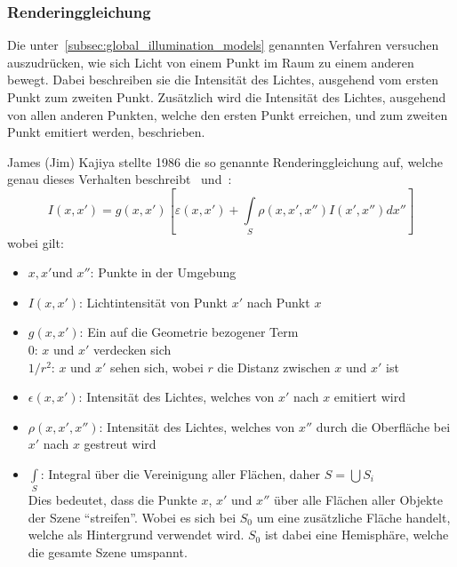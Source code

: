 \subsubsection{Renderinggleichung}
\label{ssubsec:rendering_equation}

Die unter~\ref{subsec:global_illumination_models} genannten Verfahren versuchen
auszudrücken, wie sich Licht von einem Punkt im Raum zu einem anderen bewegt.
Dabei beschreiben sie die Intensität des Lichtes, ausgehend vom ersten Punkt
zum zweiten Punkt. Zusätzlich wird die Intensität des Lichtes, ausgehend von
allen anderen Punkten, welche den ersten Punkt erreichen, und zum zweiten Punkt
emitiert werden, beschrieben.


James (Jim) Kajiya stellte 1986 die so genannte Renderinggleichung auf, welche
genau dieses Verhalten beschreibt~\cite{kajiya_rendering_1986}
und~\cite{foley_computer_1996}:
\begin{equation}
    I(x, x') = g(x, x')[\varepsilon(x, x') + \int\limits_{S}\rho(x, x', x'')I(x', x'')dx'']
\end{equation}
wobei gilt:

\begin{itemize}
    \item $x, x' \text{und } x''$: Punkte in der Umgebung
    \item $ I(x, x')$:            Lichtintensität von Punkt $x'$ nach Punkt $x$
    \item $ g(x, x')$:            Ein auf die Geometrie bezogener Term\\
                                  \hspace*{4mm} $0$:     \hspace*{6mm} $x$ und $x'$ verdecken sich\\
                                  \hspace*{4mm} $1/r^2$: \hspace*{1mm} $x$ und $x'$ sehen sich, wobei $r$ die Distanz zwischen $x$ und $x'$ ist
    \item $\epsilon(x, x')$:      Intensität des Lichtes, welches von $x'$ nach $x$ emitiert wird
    \item $\rho(x, x', x'')$:     Intensität des Lichtes, welches von $x''$
                                  durch die Oberfläche bei $x'$ nach $x$
                                  gestreut wird
    \item $\int\limits_{S}$:      Integral über die Vereinigung aller Flächen,
                                  daher $ S = \bigcup{S_{i}} $\\
                                      Dies bedeutet, dass die Punkte $x$, $x'$
                                      und $x''$ über alle Flächen aller Objekte
                                      der Szene ``streifen''.  Wobei es sich
                                      bei $S_{0}$ um eine zusätzliche Fläche
                                      handelt, welche als Hintergrund verwendet
                                      wird.  $S_{0}$ ist dabei eine Hemisphäre,
                                      welche die gesamte Szene umspannt.
\end{itemize}

